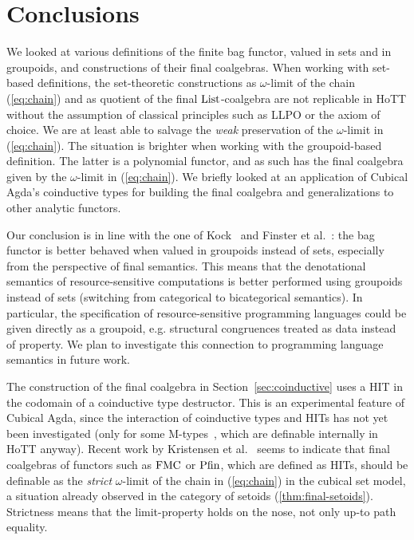 \documentclass[a4paper,USenglish,cleveref]{lipics-v2021}
\begin{document}
\section{Conclusions}

We looked at various definitions of the finite bag functor, valued in sets and in groupoids, and constructions of their final coalgebras. When working with set-based definitions, the set-theoretic constructions as $\omega$-limit of the chain (\ref{eq:chain}) and as quotient of the final $\List$-coalgebra are not replicable in HoTT without the assumption of classical principles such as LLPO or the axiom of choice. We are at least able to salvage the \emph{weak} preservation of the $\omega$-limit in (\ref{eq:chain}). The situation is brighter when working with the groupoid-based definition. The latter is a polynomial functor, and as such has the final coalgebra given by the $\omega$-limit in (\ref{eq:chain}). We briefly looked at an application of Cubical Agda's coinductive types for building the final coalgebra and generalizations to other analytic functors.

Our conclusion is in line with the one of Kock~\cite{Kock2012} and Finster et al.~\cite{Finster2021}: the bag functor is better behaved when valued in groupoids instead of sets, especially from the perspective of final semantics. This means that the denotational semantics of resource-sensitive computations %
is better performed using groupoids instead of sets (switching from categorical to bicategorical semantics). In particular, the specification of resource-sensitive programming languages could be given directly as a groupoid, e.g. structural congruences treated as data instead of property. We plan to investigate this connection to programming language semantics in future work.

The construction of the final coalgebra in Section~\ref{sec:coinductive} uses a HIT in the codomain
of a coinductive type destructor. This is an experimental feature of Cubical Agda, since the interaction of coinductive types and HITs has not yet been investigated (only for some M-types~\cite{Vezzosi2019}, which are definable internally in HoTT anyway). Recent work by Kristensen et al.~\cite{Kristensen2022} seems to indicate that final coalgebras of functors such as $\M$ or $\Op{Pfin}$, which are defined as HITs, should be definable as the \emph{strict} $\omega$-limit of the chain in (\ref{eq:chain}) in the cubical set model, a situation already observed in the category of setoids (\cref{thm:final-setoids}). Strictness means that the limit-property holds on the nose, not only up-to path equality. 



\end{document}
